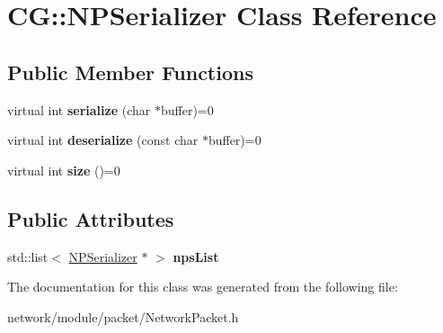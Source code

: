 \hypertarget{class_c_g_1_1_n_p_serializer}{}\section{CG\+:\+:N\+P\+Serializer Class Reference}
\label{class_c_g_1_1_n_p_serializer}
\subsection*{Public Member Functions}
\begin{DoxyCompactItemize}
\item 
\mbox{\label{class_c_g_1_1_n_p_serializer_adc3e59852d676607157fba8e3416efca}} 
virtual int {\bfseries serialize} (char $\ast$buffer)=0
\item 
\mbox{\label{class_c_g_1_1_n_p_serializer_ae939886560c4be1e3a2b1f3376299643}} 
virtual int {\bfseries deserialize} (const char $\ast$buffer)=0
\item 
\mbox{\label{class_c_g_1_1_n_p_serializer_a7ee2183ac37127bd64bb6ab2ba1fa6e6}} 
virtual int {\bfseries size} ()=0
\end{DoxyCompactItemize}
\subsection*{Public Attributes}
\begin{DoxyCompactItemize}
\item 
\mbox{\label{class_c_g_1_1_n_p_serializer_a3edd1f4c2fed9b40e283b21f775cdf9a}} 
std\+::list$<$ \mbox{\hyperlink{class_c_g_1_1_n_p_serializer}{N\+P\+Serializer}} $\ast$ $>$ {\bfseries nps\+List}
\end{DoxyCompactItemize}


The documentation for this class was generated from the following file\+:\begin{DoxyCompactItemize}
\item 
network/module/packet/Network\+Packet.\+h\end{DoxyCompactItemize}
